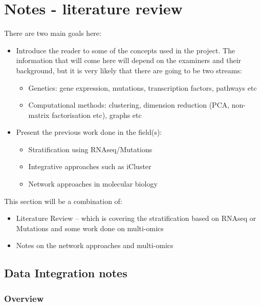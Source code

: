 \section{Notes - literature review}

There are two main goals here:
\begin{itemize}
    \item Introduce the reader to some of the concepts used in the project. The information that will come here will depend on the examiners and their background, but it is very likely that there are going to be two streams:
    \begin{itemize}
        \item Genetics: gene expression, mutations, transcription factors, pathways etc
        \item Computational methods: clustering, dimension reduction (PCA, non-matrix factorisation etc), graphs etc 
    \end{itemize}
    \item Present the previous work done in the field(s):
    \begin{itemize}
        \item Stratification using RNAseq/Mutations
        \item Integrative approaches such as iCluster
        \item Network approaches in molecular biology  
    \end{itemize}
\end{itemize}

This section will be a combination of:
\begin{itemize}
    \item Literature Review -- which is covering the stratification based on RNAseq or Mutations and some work done on multi-omics
    \item Notes on the network approaches and multi-omics
\end{itemize}


\subsection{Data Integration notes}

\subsubsection{Overview}

